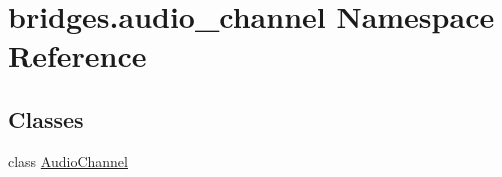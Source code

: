 \hypertarget{namespacebridges_1_1audio__channel}{}\section{bridges.\+audio\+\_\+channel Namespace Reference}
\label{namespacebridges_1_1audio__channel}
\subsection*{Classes}
\begin{DoxyCompactItemize}
\item 
class \hyperlink{classbridges_1_1audio__channel_1_1_audio_channel}{Audio\+Channel}
\end{DoxyCompactItemize}

